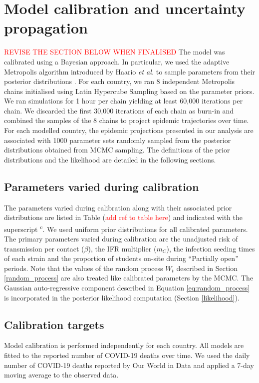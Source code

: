 \section{Model calibration and uncertainty propagation}
\label{calibration}
\textcolor{red}{REVISE THE SECTION BELOW WHEN FINALISED}
The model was calibrated using a Bayesian approach. In particular, we used the adaptive 
Metropolis algorithm introduced by Haario \textit{et al.} to sample parameters from their 
posterior distributions \cite{haario-2001}. For each country, we ran 8 independent Metropolis 
chains initialised using Latin Hypercube Sampling based on the parameter priors. 
We ran simulations for 1 hour per chain yielding at least 60,000 iterations per 
chain. We discarded the first 30,000 iterations of each chain as burn-in and combined the 
samples of the 8 chains to project epidemic trajectories over time. 
For each modelled country, the epidemic projections presented in our analysis are associated with 1000 parameter sets 
randomly sampled from the posterior distributions obtained from MCMC sampling. 
The definitions of the prior distributions and the likelihood are detailed in the following sections.

\subsection{Parameters varied during calibration}

The parameters varied during calibration along with their associated prior distributions 
are listed in Table (\textcolor{red}{add ref to table here}) and indicated with the superscript \textsuperscript{c}.
We used uniform prior distributions for all calibrated parameters. The primary parameters varied during calibration are 
the unadjusted risk of transmission per contact ($\beta$), the IFR multiplier ($m_C$), the infection seeding times of 
each strain and the proportion of students on-site during ``Partially open'' periods. Note that the values of the random 
process $W_t$ described in Section \ref{random_process} are also treated like calibrated parameters by the MCMC. The Gaussian 
auto-regressive component described in Equation \ref{eq:random_process} is incorporated in the posterior likelihood 
computation (Section \ref{likelihood}).

\subsection{Calibration targets}
\label{targets}
Model calibration is performed independently for each country. All models are fitted to the reported number of COVID-19 deaths over time.
We used the daily number of COVID-19 deaths reported by Our World in Data and applied a 7-day moving average to the observed data. 

